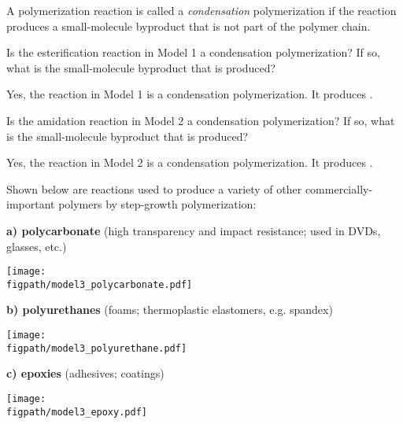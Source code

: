 \begin{activity}
\begin{infobox}
A polymerization reaction is called a \emph{condensation} polymerization if the reaction produces a small-molecule byproduct that is not part of the polymer chain.

\end{infobox}
	
\begin{ctqs}
		\question Is the esterification reaction in Model 1 a condensation polymerization?  If so, what is the small-molecule byproduct that is produced?
			
				\begin{solution}[1in]
					Yes, the reaction in Model 1 is a condensation polymerization. It produces .
				\end{solution}
		
		\question Is the amidation reaction in Model 2 a condensation polymerization?  If so, what is the small-molecule byproduct that is produced?
			
				\begin{solution}[1in]
					Yes, the reaction in Model 2 is a condensation polymerization. It produces .
				\end{solution}
		
\end{ctqs}

\begin{model}

Shown below are reactions used to produce a variety of other commercially-important polymers by step-growth polymerization:

\vspace{0.1in}

\textbf{a) polycarbonate} (high transparency and impact resistance; used in DVDs, glasses, etc.)
		
			\centerline{\texttt{[image: \\figpath/model3\_polycarbonate.pdf]}}

\vspace{0.1in}

\textbf{b) polyurethanes} (foams; thermoplastic elastomers, e.g. spandex)
		
			\centerline{\texttt{[image: \\figpath/model3\_polyurethane.pdf]}}

\vspace{0.1in}

\textbf{c) epoxies} (adhesives; coatings)
		
			\centerline{\texttt{[image: \\figpath/model3\_epoxy.pdf]}}


\end{model}
\end{activity}
